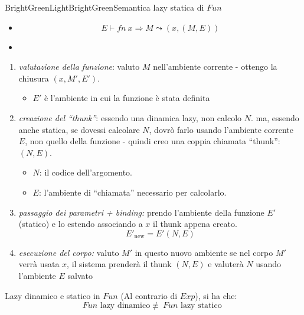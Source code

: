 \documentclass[a4paper,11pt]{report}
\begin{document}
\begin{cdefframe}{BrightGreenLight}{BrightGreen}{Semantica lazy statica di \( Fun \)}{}

    \begin{itemize}

\item{}
    \[ E \vdash fn \ x \Rightarrow M \leadsto (x, (M, E)) \]

    \item{}
    \begin{prooftree}
    \end{prooftree}
    \end{itemize}

    \begin{enumerate}
        \item \textit{valutazione della funzione}:
    valuto \( M \) nell'ambiente corrente - ottengo la chiusura \((x, M', E')\).
    \begin{itemize}
        \item \( E' \) è l'ambiente in cui la funzione è stata definita
    \end{itemize}

    \item \textit{creazione del ``thunk''}:
    essendo una dinamica lazy, non calcolo \( N \).
    ma, essendo anche statica, se dovessi calcolare \( N \), dovrò farlo usando l'ambiente corrente \( E \), non quello della funzione - quindi creo una coppia chiamata ``thunk'': \((N, E)\).
    \begin{itemize}
        \item \( N \): il codice dell'argomento.
        \item \( E \): l'ambiente di ``chiamata'' necessario per calcolarlo.
    \end{itemize}

    \item \textit{passaggio dei parametri + binding:}
    prendo l'ambiente della funzione \( E' \) (statico) e lo estendo associando a \( x \) il thunk appena creato.
    \[ E'_{\text{new}} = E'(N, E) \]
\item \textit{esecuzione del corpo:}
valuto \( M' \) in questo nuovo ambiente
    \subitem se nel corpo \( M' \) verrà usata \( x \), il sistema prenderà il thunk \((N, E)\) e valuterà \( N \) usando l'ambiente \( E \) salvato
\end{enumerate}
\end{cdefframe}
\begin{lemmaframe}{Lazy dinamico e statico in \( Fun \)}{}
    (Al contrario di \( Exp \)), si ha che:
    \[ Fun \text{ lazy dinamico} \not\equiv \ Fun \text{ lazy statico } \]
\end{lemmaframe}
\end{document}
